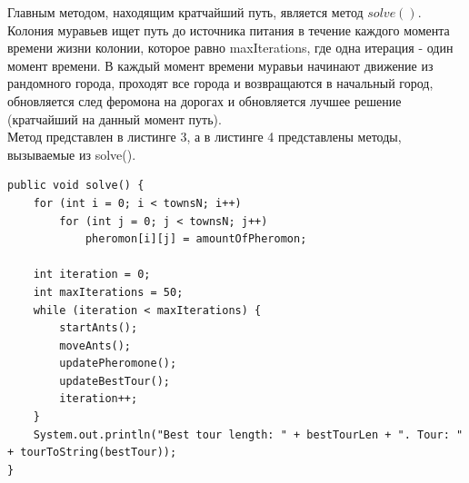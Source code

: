 \documentclass[a4paper,12pt]{article}
\begin{document}
Главным методом, находящим кратчайший путь, является метод $solve()$. Колония муравьев ищет путь до источника питания в течение каждого момента времени жизни колонии, которое равно maxIterations, где одна итерация - один момент времени. В каждый момент времени муравьи начинают движение из рандомного города, проходят все города и возвращаются в начальный город, обновляется след феромона на дорогах и обновляется лучшее решение (кратчайший на данный момент путь).\\
Метод представлен в листинге 3, а в листинге 4 представлены методы, вызываемые из solve(). 
\begin{lstlisting}[label=some-code,caption=Метод solve()]
public void solve() {
    for (int i = 0; i < townsN; i++)
        for (int j = 0; j < townsN; j++)
            pheromon[i][j] = amountOfPheromon;

    int iteration = 0;
    int maxIterations = 50;
    while (iteration < maxIterations) {
        startAnts();
        moveAnts();
        updatePheromone();
        updateBestTour();
        iteration++;
    }
    System.out.println("Best tour length: " + bestTourLen + ". Tour: " + tourToString(bestTour));
}
\end{lstlisting}
\end{document}
